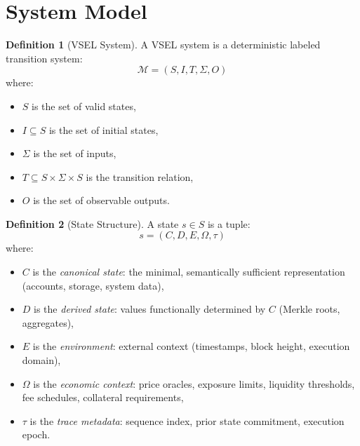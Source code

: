 \documentclass[11pt,a4paper]{article}
\theoremstyle{definition}
\newtheorem{definition}{Definition}[section]
\begin{document}
\section{System Model}
\label{sec:system-model}

\begin{definition}[VSEL System]
\label{def:vsel-system}
A VSEL system is a deterministic labeled transition system:
\begin{equation}
\mathcal{M} = (S, I, T, \Sigma, O)
\end{equation}
where:
\begin{itemize}[nosep]
\item $S$ is the set of valid states,
\item $I \subseteq S$ is the set of initial states,
\item $\Sigma$ is the set of inputs,
\item $T \subseteq S \times \Sigma \times S$ is the transition relation,
\item $O$ is the set of observable outputs.
\end{itemize}
\end{definition}

\begin{definition}[State Structure]
\label{def:state-structure}
A state $s \in S$ is a tuple:
\begin{equation}
s = (C, D, E, \Omega, \tau)
\end{equation}
where:
\begin{itemize}[nosep]
\item $C$ is the \emph{canonical state}: the minimal, semantically sufficient representation (accounts, storage, system data),
\item $D$ is the \emph{derived state}: values functionally determined by $C$ (Merkle roots, aggregates),
\item $E$ is the \emph{environment}: external context (timestamps, block height, execution domain),
\item $\Omega$ is the \emph{economic context}: price oracles, exposure limits, liquidity thresholds, fee schedules, collateral requirements,
\item $\tau$ is the \emph{trace metadata}: sequence index, prior state commitment, execution epoch.
\end{itemize}
\end{definition}
\end{document}

